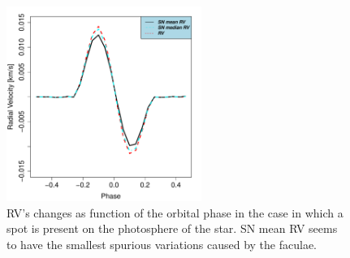 \documentclass[11pt, oneside]{article}
\begin{document}
\begin{figure}[htbp]
   \centering
\includegraphics[height = 2.5in]{RV_comparison_SPOT.pdf} 
\caption{RV's changes as function of the orbital phase in the case in which a spot is present on the photosphere of the star. SN mean RV seems to have the smallest spurious variations caused by the faculae.}
    \label{fig:spot}
\end{figure}
\end{document}
